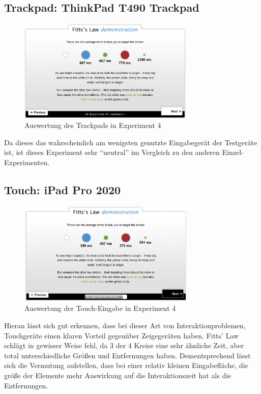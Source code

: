 \documentclass{article}
\begin{document}
\subsection{Trackpad: ThinkPad T490 Trackpad}

\begin{figure}[h!]
	\centering
	\includegraphics[width=0.75\textwidth]{experiment-4-trackpad}
	\caption{Auswertung des Trackpads in Experiment 4}
\end{figure}

Da dieses das wahrscheinlich am wenigsten genutzte Eingabegerät der Testgeräte ist,
ist dieses Experiment sehr ``neutral'' im Vergleich zu den anderen
Einzel-Experimenten.

\subsection{Touch: iPad Pro 2020}

\begin{figure}[h!]
	\centering
	\includegraphics[width=0.75\textwidth]{experiment-4-ipad}
	\caption{Auswertung der Touch-Eingabe in Experiment 4}
\end{figure}

Hieran lässt sich gut erkennen, dass bei dieser Art von Interaktionproblemen,
Touchgeräte einen klaren Vorteil gegenüber Zeigegeräten haben. Fitts' Law
schlägt in gewisser Weise fehl, da 3 der 4 Kreise eine sehr ähnliche Zeit,
aber total unterschiedliche Größen und Entfernungen haben. Dementsprechend
lässt sich die Vermutung aufstellen, dass bei einer relativ kleinen
Eingabefläche, die größe der Elemente mehr Auswirkung auf die Interaktionszeit
hat als die Entfernungen.
\end{document}
